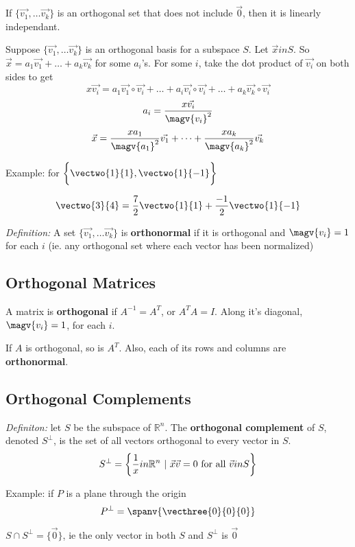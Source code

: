 \documentclass[12pt]{article}
\newcommand{\R}[1]{\mathbb{R}^{#1}}
\begin{document}
If $\{\vec{v_1},\dots \vec{v_k}\}$ is an orthogonal set that does not include $\vec{0}$, then it is linearly independant.

Suppose $\{\vec{v_1},\dots \vec{v_k}\}$ is an orthogonal basis for a subspace $S$. Let $\vec{x}in S$. So $\vec{x} = a_1\vec{v_1} + \dots + a_k\vec{v_k}$ for some $a_i$'s. For some $i$, take the dot product of $\vec{v_i}$ on both sides to get \[ x\vec{v_i} = a_1\vec{v_1}\circ\vec{v_i} + \dots + a_i\vec{v_i}\circ\vec{v_i} + \dots + a_k\vec{v_k}\circ\vec{v_i} \] \[ a_i = \frac{x\vec{v_i}}{\magv{v_i}^2} \] \[ \vec{x} = \frac{xa_1}{\magv{a_1}^2}\vec{v_1} + \dots + \frac{xa_k}{\magv{a_k}^2}\vec{v_k} \]

Example: for $\bigg\{\vectwo{1}{1},\vectwo{1}{-1}\bigg\}$

\[ \vectwo{3}{4} = \frac{7}{2}\vectwo{1}{1} + \frac{-1}{2}\vectwo{1}{-1} \]

\textit{Definition:} A set $\{\vec{v_1}, \dots \vec{v_k}\}$ is {\bf orthonormal} if it is orthogonal and $\magv{v_i} = 1$ for each $i$ (ie. any orthogonal set where each vector has been normalized)


\subsection*{Orthogonal Matrices}
A matrix is {\bf orthogonal} if $A^{-1} = A^T$, or $A^TA = I$. Along it's diagonal, $\magv{v_i} = 1$, for each $i$.

If $A$ is orthogonal, so is $A^T$. Also, each of its rows and columns are {\bf orthonormal}.


\subsection*{Orthogonal Complements}
\textit{Definiton:} let $S$ be the subspace of $\R{n}$. The {\bf orthogonal complement} of $S$, denoted $S^\perp$, is the set of all vectors orthogonal to every vector in $S$. \[ S^\perp = \bigg\{\frac{1}{x}in\R{n}\suchthat \vec{x}\vec{v} = 0 \text{ for all } \vec{v}in S\bigg\} \]

Example: if $P$ is a plane through the origin \[ P^\perp = \spanv{\vecthree{0}{0}{0}} \]

$S\cap S^\perp = \{\vec{0}\}$, ie the only vector in both $S$ and $S^\perp$ is $\vec{0}$
\end{document}
